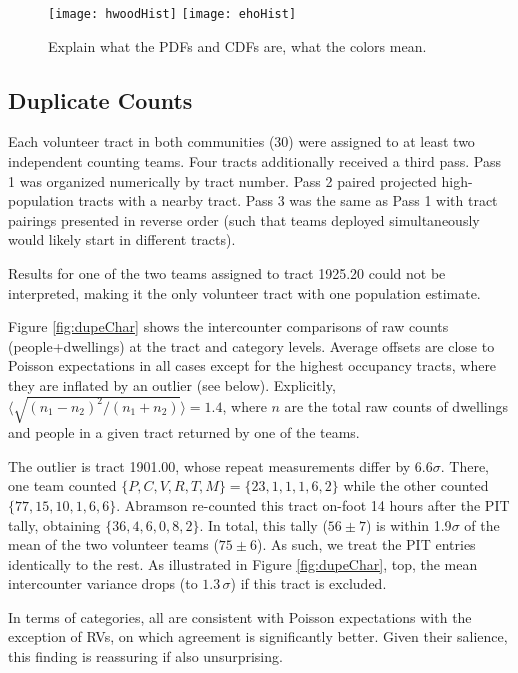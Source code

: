 \documentclass[11pt,twocolumn]{article}
\begin{document}
\begin{figure}[t]
	\centering
	\texttt{[image: hwoodHist]}
	\texttt{[image: ehoHist]}
	\caption{Explain what the PDFs and CDFs are, what the colors mean.}
	\label{fig:communityPDFs}
\end{figure}

\subsection{Duplicate Counts}
\label{sec:dupes}

Each volunteer tract in both communities (30) were assigned to at least two independent counting teams.
Four tracts additionally received a third pass. Pass 1 was organized numerically by tract number.
Pass 2 paired projected high-population tracts with a nearby tract. Pass 3 was the same as Pass 1 with 
tract pairings presented in reverse order (such that teams deployed simultaneously would likely start 
in different tracts). 

Results for one of the two teams assigned to tract 1925.20 could not be interpreted, making it the only
volunteer tract with one population estimate.

Figure \ref{fig:dupeChar} shows the intercounter comparisons of raw counts (people+dwellings)
at the tract and category levels. Average offsets are close to Poisson expectations in all cases 
except for the highest occupancy tracts, where they are inflated by an outlier (see below).
Explicitly, $\langle\sqrt{(n_{1}-n_{2})^{2}/(n_{1} + n_{2})}\rangle=1.4$, where
$n$ are the total raw counts of dwellings and people in a given tract returned by one of the teams. 

The outlier is tract 1901.00, whose repeat measurements differ by $6.6\sigma$. There, 
one team counted $\{P,C,V,R,T,M\}=\{23,1,1,1,6,2\}$ while the other counted $\{77,15,10,1,6,6\}$. 
Abramson re-counted this tract on-foot 14 hours after the PIT tally, obtaining $\{36, 4, 6, 0, 8, 2\}$.
In total, this tally ($56\pm7$) is within 1.9$\sigma$ of the mean of the two volunteer teams ($75\pm6$). 
As such, we treat the PIT entries identically to the rest.  As illustrated in Figure \ref{fig:dupeChar}, top,
the mean intercounter variance drops (to $1.3\,\sigma$) if this tract is excluded.

In terms of categories, all are consistent with Poisson expectations with the exception of RVs, on 
which agreement is significantly better. Given their salience, this finding is reassuring if also unsurprising.
\end{document}
